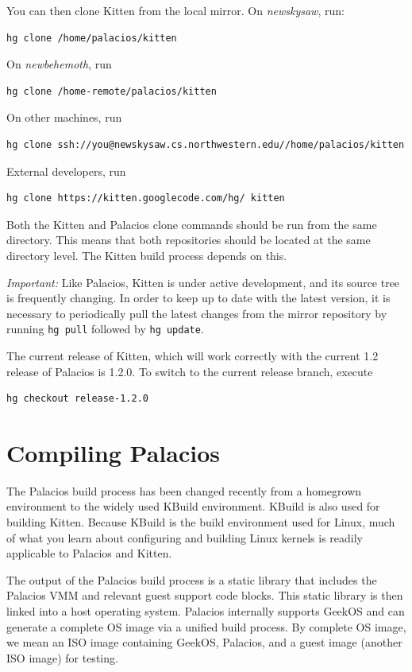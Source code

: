 \documentclass[11pt]{article}
\begin{document}
You can then clone Kitten from the local mirror.   On {\em newskysaw},
run: 
\begin{verbatim}
hg clone /home/palacios/kitten
\end{verbatim}
On {\em newbehemoth}, run
\begin{verbatim}
hg clone /home-remote/palacios/kitten
\end{verbatim}
On other machines, run
\begin{verbatim}
hg clone ssh://you@newskysaw.cs.northwestern.edu//home/palacios/kitten
\end{verbatim}
External developers, run
\begin{verbatim}
hg clone https://kitten.googlecode.com/hg/ kitten
\end{verbatim}

Both the Kitten and Palacios clone commands should be run from the
same directory. This means that both repositories should be located at
the same directory level. The Kitten build process depends on this.

{\em Important:} Like Palacios, Kitten is under active development,
and its source tree is frequently changing. In order to keep up to
date with the latest version, it is necessary to periodically pull the
latest changes from the mirror repository by running \verb.hg pull.
followed by \verb.hg update..

The current release of Kitten, which will work correctly with the current 1.2 release of Palacios is 1.2.0. 
To switch to the current release branch, execute

\begin{verbatim}
hg checkout release-1.2.0
\end{verbatim}


\section{Compiling Palacios}

The Palacios build process has been changed recently from a homegrown
environment to the widely used KBuild environment.  KBuild is also
used for building Kitten.  Because KBuild is the build environment
used for Linux, much of what you learn about configuring and building
Linux kernels is readily applicable to Palacios and Kitten. 

The output of the Palacios build process is a static library that
includes the Palacios VMM and relevant guest support code blocks. This
static library is then linked into a host operating system. Palacios
internally supports GeekOS and can generate a complete OS image via a
unified build process.  By complete OS image, we mean an ISO image
containing GeekOS, Palacios, and a guest image (another ISO image) for
testing. 
\end{document}
